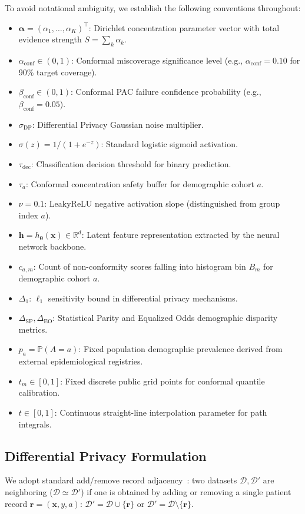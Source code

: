 \documentclass[3p,12pt]{elsarticle}
\theoremstyle{plain}
\theoremstyle{definition}
\begin{document}
To avoid notational ambiguity, we establish the following conventions throughout:
\begin{itemize}
    \item $\boldsymbol{\alpha} = (\alpha_1, \dots, \alpha_K)^\top$: Dirichlet concentration parameter vector with total evidence strength $S = \sum_k \alpha_k$.
    \item $\alpha_{\text{conf}} \in (0, 1)$: Conformal miscoverage significance level (e.g., $\alpha_{\text{conf}} = 0.10$ for 90\% target coverage).
    \item $\beta_{\text{conf}} \in (0, 1)$: Conformal PAC failure confidence probability (e.g., $\beta_{\text{conf}} = 0.05$).
    \item $\sigma_{\text{DP}}$: Differential Privacy Gaussian noise multiplier.
    \item $\sigma(z) = 1/(1 + e^{-z})$: Standard logistic sigmoid activation.
    \item $\tau_{\text{dec}}$: Classification decision threshold for binary prediction.
    \item $\tau_a$: Conformal concentration safety buffer for demographic cohort $a$.
    \item $\nu = 0.1$: LeakyReLU negative activation slope (distinguished from group index $a$).
    \item $\mathbf{h} = h_{\boldsymbol{\theta}}(\mathbf{x}) \in \mathbb{R}^d$: Latent feature representation extracted by the neural network backbone.
    \item $c_{a, m}$: Count of non-conformity scores falling into histogram bin $B_m$ for demographic cohort $a$.
    \item $\Delta_1$: $\ell_1$ sensitivity bound in differential privacy mechanisms.
    \item $\Delta_{\text{SP}}, \Delta_{\text{EO}}$: Statistical Parity and Equalized Odds demographic disparity metrics.
    \item $p_a = \mathbb{P}(A = a)$: Fixed population demographic prevalence derived from external epidemiological registries.
    \item $t_m \in [0, 1]$: Fixed discrete public grid points for conformal quantile calibration.
    \item $t \in [0, 1]$: Continuous straight-line interpolation parameter for path integrals.
\end{itemize}

\subsection{Differential Privacy Formulation}
We adopt standard add/remove record adjacency~\cite{dwork2014algorithmic}: two datasets $\mathcal{D}, \mathcal{D}'$ are neighboring ($\mathcal{D} \simeq \mathcal{D}'$) if one is obtained by adding or removing a single patient record $\mathbf{r} = (\mathbf{x}, y, a)$: $\mathcal{D}' = \mathcal{D} \cup \{\mathbf{r}\}$ or $\mathcal{D}' = \mathcal{D} \setminus \{\mathbf{r}\}$.
\end{document}
